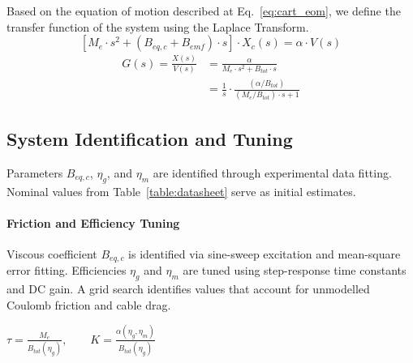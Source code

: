\documentclass[11pt,a4paper]{article}
\begin{document}
Based on the equation of motion described at Eq.~\ref{eq:cart_eom}, we define the transfer function of the system using the Laplace Transform.
\begin{equation}
	\label{eq:cart_eom_laplace}
	[M_e \cdot s^2 + (B_{eq,c} + B_{emf}) \cdot s]\cdot X_c(s) = \alpha \cdot V(s)
\end{equation}
\begin{equation}
	\label{eq:cart_tf}
	\begin{aligned}
		G(s) = \frac{X(s)}{V(s)} & = \frac{\alpha}{M_e \cdot s^2 + B_{tot} \cdot s}                           \\
		                         & = \frac{1}{s} \cdot \frac{(\alpha / B_{tot})}{(M_e / B_{tot}) \cdot s + 1}
	\end{aligned}
\end{equation}

\subsection{System Identification and Tuning} \label{sec:tuning}
Parameters $B_{eq,c}$, $\eta_g$, and $\eta_m$ are identified through experimental data fitting. Nominal values from Table~\ref{table:datasheet} serve as initial estimates.

\paragraph{Friction and Efficiency Tuning}
Viscous coefficient $B_{eq,c}$ is identified via sine-sweep excitation and mean-square error fitting. Efficiencies $\eta_g$ and $\eta_m$ are tuned using step-response time constants and DC gain. A grid search identifies values that account for unmodelled Coulomb friction and cable drag.

$\tau = \frac{M_e}{B_{tot}(\eta_g)}, \qquad K = \frac{\alpha (\eta_g,\eta_m)}{B_{tot}(\eta_g)}$
\end{document}
